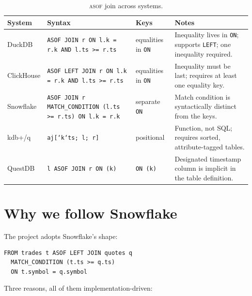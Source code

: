 \documentclass[11pt,a4paper]{report}
\theoremstyle{definition}
\theoremstyle{plain}
\newcommand{\code}[1]{\texttt{\small #1}}
\newcommand{\asof}{{\normalfont\scshape asof}}
\begin{document}
\begin{table}[h]
\centering
\footnotesize
\renewcommand{\arraystretch}{1.25}
\begin{tabular}{@{}p{1.9cm}p{5.1cm}p{2.3cm}p{3.1cm}@{}}
\toprule
\textbf{System} & \textbf{Syntax} & \textbf{Keys} & \textbf{Notes}\\
\midrule
DuckDB &
\code{ASOF JOIN r ON l.k = r.k AND l.ts >= r.ts} &
equalities in \code{ON} &
Inequality lives in \code{ON}; supports \code{LEFT}; one inequality required.\\

ClickHouse &
\code{ASOF LEFT JOIN r ON l.k = r.k AND l.ts >= r.ts} &
equalities in \code{ON} &
Inequality must be last; requires at least one equality key.\\

Snowflake &
\code{ASOF JOIN r MATCH\_CONDITION (l.ts >= r.ts) ON l.k = r.k} &
separate \code{ON} &
Match condition is syntactically distinct from the keys.\\

kdb+/q &
\code{aj[`k`ts; l; r]} &
positional &
Function, not SQL; requires sorted, attribute-tagged tables.\\

QuestDB &
\code{l ASOF JOIN r ON (k)} &
\code{ON (k)} &
Designated timestamp column is implicit in the table definition.\\
\bottomrule
\end{tabular}
\caption{\asof{} join across systems.}
\label{tab:systems}
\end{table}

\section{Why we follow Snowflake}

The project adopts Snowflake's shape:

\begin{lstlisting}
FROM trades t ASOF LEFT JOIN quotes q
  MATCH_CONDITION (t.ts >= q.ts)
  ON t.symbol = q.symbol
\end{lstlisting}

Three reasons, all of them implementation-driven:
\end{document}
